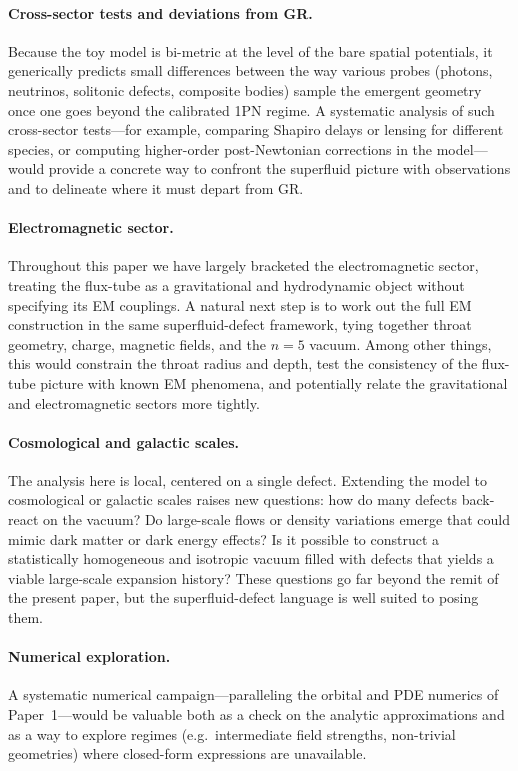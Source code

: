 \documentclass[11pt]{article}
\begin{document}
\paragraph{Cross-sector tests and deviations from GR.}
Because the toy model is bi-metric at the level of the bare spatial
potentials, it generically predicts small differences between the way
various probes (photons, neutrinos, solitonic defects, composite bodies)
sample the emergent geometry once one goes beyond the calibrated 1PN
regime.
A systematic analysis of such cross-sector tests---for example, comparing
Shapiro delays or lensing for different species, or computing higher-order
post-Newtonian corrections in the model---would provide a concrete way to
confront the superfluid picture with observations and to delineate where
it must depart from GR.

\paragraph{Electromagnetic sector.}
Throughout this paper we have largely bracketed the electromagnetic sector,
treating the flux-tube as a gravitational and hydrodynamic object without
specifying its EM couplings.
A natural next step is to work out the full EM construction in the same
superfluid-defect framework, tying together throat geometry, charge,
magnetic fields, and the $n=5$ vacuum.
Among other things, this would constrain the throat radius and depth, test
the consistency of the flux-tube picture with known EM phenomena, and
potentially relate the gravitational and electromagnetic sectors more
tightly.

\paragraph{Cosmological and galactic scales.}
The analysis here is local, centered on a single defect.
Extending the model to cosmological or galactic scales raises new
questions: how do many defects back-react on the vacuum?
Do large-scale flows or density variations emerge that could mimic dark
matter or dark energy effects?
Is it possible to construct a statistically homogeneous and isotropic
vacuum filled with defects that yields a viable large-scale expansion
history?
These questions go far beyond the remit of the present paper, but the
superfluid-defect language is well suited to posing them.

\paragraph{Numerical exploration.}
A systematic numerical campaign---paralleling the orbital and PDE numerics
of Paper~1---would be valuable both as a check on the analytic approximations
and as a way to explore regimes (e.g.\ intermediate field strengths,
non-trivial geometries) where closed-form expressions are unavailable.
\end{document}
